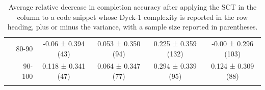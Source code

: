 \documentclass[usenames,dvipsnames]{article} %
\begin{document}
\begin{center}
\begin{table}[H]
\begin{tabular}{|c|r|c|c|c|c|}
      & 80-90               & -0.06 ± 0.394 (43)  & 0.053 ± 0.350 (94)  & 0.225 ± 0.359 (132) & -0.00 ± 0.296 (103) \\
      & 90-100              & 0.118 ± 0.341 (47)  & 0.064 ± 0.347 (77)  & 0.294 ± 0.339 (95)  & 0.124 ± 0.309 (88)  \\
      &                     &                     &                     &                     &                     \\
      \hline
    \end{tabular}
    \caption{\label{tab:code-synth}Average relative decrease in completion accuracy after applying the SCT in the column to a code snippet whose Dyck-1 complexity is reported in the row heading, plus or minus the variance, with a sample size reported in parentheses.}
  \end{table}
\end{center}
\end{document}
